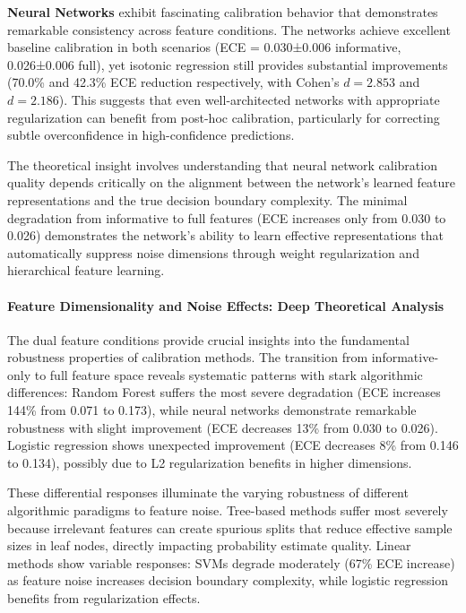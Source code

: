 \documentclass[12pt, a4paper]{article}
\begin{document}
\textbf{Neural Networks} exhibit fascinating calibration behavior that demonstrates remarkable consistency across feature conditions. The networks achieve excellent baseline calibration in both scenarios (ECE = 0.030±0.006 informative, 0.026±0.006 full), yet isotonic regression still provides substantial improvements (70.0\% and 42.3\% ECE reduction respectively, with Cohen's $d = 2.853$ and $d = 2.186$). This suggests that even well-architected networks with appropriate regularization can benefit from post-hoc calibration, particularly for correcting subtle overconfidence in high-confidence predictions.

The theoretical insight involves understanding that neural network calibration quality depends critically on the alignment between the network's learned feature representations and the true decision boundary complexity. The minimal degradation from informative to full features (ECE increases only from 0.030 to 0.026) demonstrates the network's ability to learn effective representations that automatically suppress noise dimensions through weight regularization and hierarchical feature learning.

\paragraph{Feature Dimensionality and Noise Effects: Deep Theoretical Analysis}

The dual feature conditions provide crucial insights into the fundamental robustness properties of calibration methods. The transition from informative-only to full feature space reveals systematic patterns with stark algorithmic differences: Random Forest suffers the most severe degradation (ECE increases 144\% from 0.071 to 0.173), while neural networks demonstrate remarkable robustness with slight improvement (ECE decreases 13\% from 0.030 to 0.026). Logistic regression shows unexpected improvement (ECE decreases 8\% from 0.146 to 0.134), possibly due to L2 regularization benefits in higher dimensions.

These differential responses illuminate the varying robustness of different algorithmic paradigms to feature noise. Tree-based methods suffer most severely because irrelevant features can create spurious splits that reduce effective sample sizes in leaf nodes, directly impacting probability estimate quality. Linear methods show variable responses: SVMs degrade moderately (67\% ECE increase) as feature noise increases decision boundary complexity, while logistic regression benefits from regularization effects.
\end{document}

